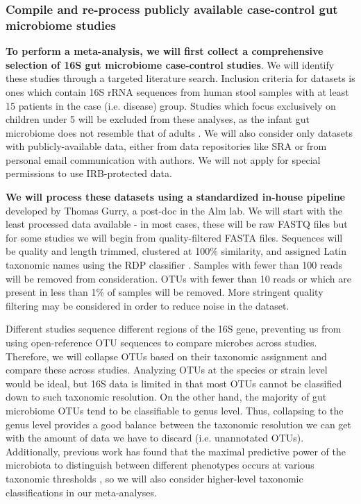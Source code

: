 \documentclass[12pt]{article}
\begin{document}
\subsubsection{Compile and re-process publicly available case-control gut microbiome studies}
\textbf{To perform a meta-analysis, we will first collect a 
comprehensive selection of 16S gut microbiome case-control studies}. We 
will identify these studies through a targeted literature search.  
Inclusion criteria for datasets is ones which contain 
16S rRNA sequences from human stool samples with at least 15 patients in the
case (i.e. disease) group. Studies which focus exclusively on 
children under 5 will be excluded from these analyses, as the infant
gut microbiome does not resemble that of adults \cite{lozupone-meta-2013}.
We will also consider only datasets with 
publicly-available data, either from data repositories like SRA or
from personal email communication with authors. We will not 
apply for special permissions to use IRB-protected data. 

\textbf{We will process these datasets using a standardized in-house pipeline} 
developed by Thomas Gurry, a post-doc in the Alm lab. We will 
start with the least processed data available - in most cases, these will be 
raw FASTQ files but for some studies we will begin from quality-filtered 
FASTA files. Sequences will be quality and length trimmed, clustered 
at 100\% similarity, and assigned Latin taxonomic names using the RDP 
classifier \cite{wang-rdp-2007}. Samples with fewer than 100 reads will be removed from 
consideration. OTUs with fewer than 10 reads or which are present in 
less than 1\% of samples will be removed. More stringent quality 
filtering may be considered in order to reduce noise in the dataset.

Different studies sequence different regions of the 16S gene,
preventing us from using open-reference OTU sequences to compare
microbes across studies. Therefore, we will collapse OTUs
based on their taxonomic assignment and compare these across studies.
Analyzing OTUs at the species or strain level would be ideal,
but 16S data is limited in that most OTUs cannot be classified
down to such taxonomic resolution. On the other hand, the majority of gut microbiome
OTUs tend to be classifiable to genus level. Thus, collapsing to the genus level 
provides a good balance between the taxonomic resolution we can get with the 
amount of data we have to discard (i.e. unannotated OTUs).
Additionally, previous work has found that the maximal predictive power of the microbiota
to distinguish between different phenotypes
occurs at various taxonomic thresholds \cite{knights-biomarkers-2011}, so we will
also consider higher-level taxonomic classifications in our meta-analyses.
\end{document}
